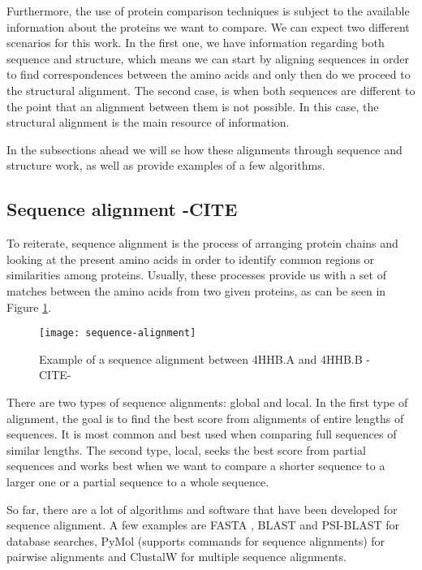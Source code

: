 Furthermore, the use of protein comparison techniques is subject to the available information about the proteins we want to compare. We can expect two different scenarios for this work. In the first one, we have information regarding both sequence and structure, which means we can start by aligning sequences in order to find correspondences between the amino acids and only then do we proceed to the structural alignment. The second case, is when both sequences are different to the point that an alignment between them is not possible. In this case, the structural alignment is the main resource of information.

In the subsections ahead we will se how these alignments through sequence and structure work, as well as provide examples of a few algorithms.

\subsection{Sequence alignment -CITE}

To reiterate, sequence alignment is the process of arranging protein chains and looking at the present amino acids in order to identify common regions or similarities among proteins. Usually, these processes provide us with a set of matches between the amino acids from two given proteins, as can be seen in Figure \ref{fig:sequencealignment}. 

\begin{figure}[htbp]
	\centering
	\texttt{[image: sequence-alignment]}
	\caption{Example of a sequence alignment between 4HHB.A and 4HHB.B -CITE-}
	\label{fig:sequencealignment}
\end{figure}

There are two types of sequence alignments: global and local. In the first type of alignment, the goal is to find the best score from alignments of entire lengths of sequences. It is most common and best used when comparing full sequences of similar lengths. The second type, local, seeks the best score from partial sequences and works best when we want to compare a shorter sequence to a larger one or a partial sequence to a whole sequence.

So far, there are a lot of algorithms and software that have been developed for sequence alignment. A few examples are FASTA \cite{lipman1985rapid}, BLAST \cite{altschul1990basic} and PSI-BLAST \cite{altschul1997gapped} for database searches, PyMol \cite{delano2002pymol} (supports commands for sequence alignments) for pairwise alignments and ClustalW \cite{chenna2003multiple} for multiple sequence alignments.

